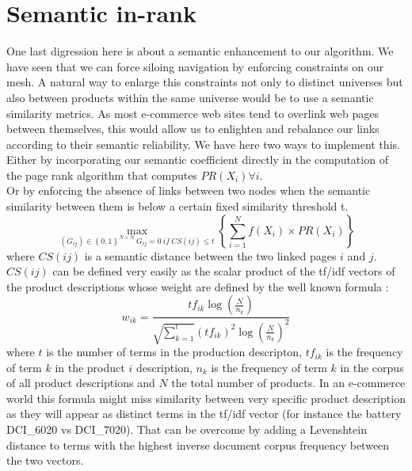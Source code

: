 \documentclass{iSWAGArticle}
\begin{document}
  \section{Semantic in-rank}
  One last digression here is about a semantic enhancement to our algorithm. We have seen that we can force siloing navigation by enforcing constraints on our mesh.
  A natural way to enlarge this constraints not only to distinct universes but also between products within the same universe would be to use a semantic similarity metrics.
  As most e-commerce web sites tend to overlink web pages between themselves, this would allow us to enlighten and rebalance our links according to their semantic reliability.  
  We have here two ways to implement this. 
  \\\newline
  Either by incorporating our semantic coefficient directly in the computation of the page rank algorithm that computes $PR(X_i) \forall i$. 
  \\\newline
  Or by enforcing the absence of links between two nodes when the semantic similarity between them is below a certain fixed similarity threshold t.
  \begin{equation}
  \max_{\left(G_{ij}\right)  \in \left\{0,1\right\}^{N\times N}\ G_{ij}=0 \ if \ CS(ij)\leq t}\left\{ \sum^{N}_{i=1} f\left(X_i\right)\times PR(X_i)\right\}
  \end{equation}
  where $CS(ij)$ is a semantic distance between the two linked pages $i$ and $j$. $CS(ij)$ can be defined very easily as the scalar product of the tf/idf vectors of the
  product descriptions whose weight are defined by the well known formula :
  \begin{equation}
  w_{ik}=\frac{tf_{ik}\log\left( \frac{N}{n_k}\right)}{\sqrt{\sum_{k=1}^t}(tf_{ik})^2 \log\left(\frac{N}{n_k}\right)^2}
  \end{equation}
  where $t$ is the number of terms in the production descripton, $tf_{ik}$ is the frequency of term $k$ in the product $i$ description, $n_{k}$ is the frequency of term $k$ in the corpus
  of all product descriptions and $N$ the total number of products. In an e-commerce world this formula might miss similarity between very specific product description 
  as they will appear as distinct terms in the tf/idf vector (for instance the battery DCI\_6020 vs DCI\_7020). That can be overcome by adding a Levenshtein distance to terms 
  with the highest inverse document corpus frequency between the two vectors.
\end{document}
